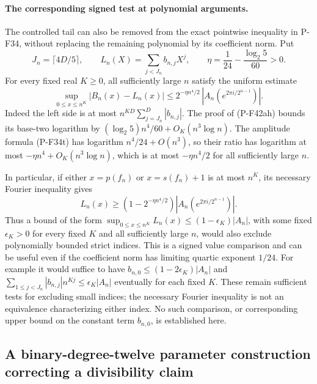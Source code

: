 \documentclass[11pt,a4paper]{article}
\begin{document}
\paragraph{The corresponding signed test at polynomial arguments.}
The controlled tail can also be removed from the exact
pointwise inequality in P-F34, without replacing the
remaining polynomial by its coefficient norm.
Put
\[
 J_n=\lceil4D/5\rceil,\qquad
 L_n(X)=\sum_{j<J_n}b_{n,j}X^j,\qquad
 \eta=\frac1{24}-\frac{\log_2 5}{60}>0.
 \tag{P-F42ai}
\]
For every fixed real \(K\ge0\), all sufficiently large \(n\)
satisfy the uniform estimate
\[
 \sup_{0\le x\le n^K}|B_n(x)-L_n(x)|
       \le 2^{-\eta n^4/2}\,
                 |A_n(e^{2\pi i/2^{n-1}})|.
 \tag{P-F42aj}
\]
Indeed the left side is at most
\(n^{KD}\sum_{j=J_n}^D|b_{n,j}|\).
The proof of (P-F42ah) bounds its base-two logarithm by
\((\log_2 5)n^4/60+O_K(n^3\log n)\).
The amplitude formula (P-F34t) has logarithm
\(n^4/24+O(n^3)\), so their ratio has logarithm at most
\(-\eta n^4+O_K(n^3\log n)\), which is at most
\(-\eta n^4/2\) for all sufficiently large \(n\).

In particular, if either \(x=p(f_n)\) or \(x=s(f_n)+1\)
is at most \(n^K\), its necessary Fourier inequality gives
\[
 L_n(x)\ge
       (1-2^{-\eta n^4/2})
                 |A_n(e^{2\pi i/2^{n-1}})|.
 \tag{P-F42ak}
\]
Thus a bound of the form
\(\sup_{0\le x\le n^K}L_n(x)\le(1-\epsilon_K)|A_n|\),
with some fixed \(\epsilon_K>0\) for every fixed \(K\)
and all sufficiently large \(n\), would also exclude
polynomially bounded strict indices. This is a signed
value comparison and can be useful even if the coefficient
norm has limiting quartic exponent \(1/24\).
For example it would suffice to have
\(b_{n,0}\le(1-2\epsilon_K)|A_n|\) and
\(\sum_{1\le j<J_n}|b_{n,j}|n^{Kj}\le\epsilon_K|A_n|\)
eventually for each fixed \(K\).
These remain sufficient tests for excluding small indices;
the necessary Fourier inequality is not an equivalence
characterizing either index.
No such comparison, or corresponding upper bound on
the constant term \(b_{n,0}\), is established here.


\subsection{A binary-degree-twelve parameter construction correcting a divisibility claim}
\label{sec:binary12-hsop}
\end{document}
